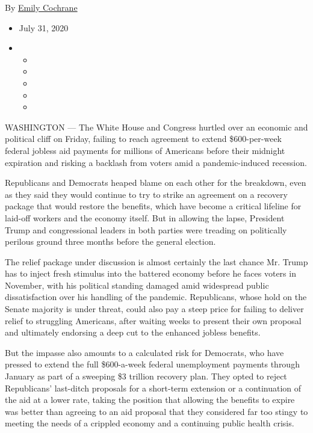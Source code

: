 By \href{https://www.nytimes3xbfgragh.onion/by/emily-cochrane}{Emily
Cochrane}

\begin{itemize}
\item
  July 31, 2020
\item
  \begin{itemize}
  \item
  \item
  \item
  \item
  \item
  \end{itemize}
\end{itemize}

WASHINGTON --- The White House and Congress hurtled over an economic and
political cliff on Friday, failing to reach agreement to extend
\$600-per-week federal jobless aid payments for millions of Americans
before their midnight expiration and risking a backlash from voters amid
a pandemic-induced recession.

Republicans and Democrats heaped blame on each other for the breakdown,
even as they said they would continue to try to strike an agreement on a
recovery package that would restore the benefits, which have become a
critical lifeline for laid-off workers and the economy itself. But in
allowing the lapse, President Trump and congressional leaders in both
parties were treading on politically perilous ground three months before
the general election.

The relief package under discussion is almost certainly the last chance
Mr. Trump has to inject fresh stimulus into the battered economy before
he faces voters in November, with his political standing damaged amid
widespread public dissatisfaction over his handling of the pandemic.
Republicans, whose hold on the Senate majority is under threat, could
also pay a steep price for failing to deliver relief to struggling
Americans, after waiting weeks to present their own proposal and
ultimately endorsing a deep cut to the enhanced jobless benefits.

But the impasse also amounts to a calculated risk for Democrats, who
have pressed to extend the full \$600-a-week federal unemployment
payments through January as part of a sweeping \$3 trillion recovery
plan. They opted to reject Republicans' last-ditch proposals for a
short-term extension or a continuation of the aid at a lower rate,
taking the position that allowing the benefits to expire was better than
agreeing to an aid proposal that they considered far too stingy to
meeting the needs of a crippled economy and a continuing public health
crisis.

